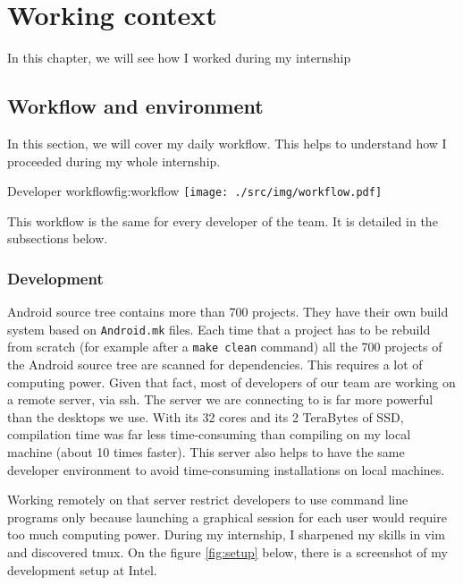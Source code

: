 \chapter{Working context}\label{chap:organisation}

In this chapter, we will see how I worked during my internship

\section{Workflow and environment}
In this section, we will cover my daily workflow. This helps
to understand how I proceeded during my whole internship.

\begin{figureGraphics}{Developer workflow}{fig:workflow}
    \texttt{[image: ./src/img/workflow.pdf]}
\end{figureGraphics}

This workflow is the same for every developer of the team. It is
detailed in the subsections below.

\subsection{Development}
Android source tree contains more than 700 projects. They have their own build system
based on \lstinline{Android.mk} files. Each time that a project has to be rebuild from scratch (for example after a  \lstinline{make clean} command) all
the 700 projects of the Android source tree are scanned for dependencies. This requires a lot of computing power.
Given that fact, most of developers of our team are working on a remote server, via ssh.
The server we are connecting to is far more powerful than the desktops we use.
With its 32 cores and its 2 TeraBytes of SSD, compilation time was far less time-consuming
than compiling on my local machine (about 10 times faster).
This server also helps to have the same developer environment to avoid
time-consuming installations on local machines.

Working remotely on that server restrict developers to use command line programs only because
launching a graphical session for each user would require too much computing power.
During my internship, I sharpened my skills in \gls{vim} and discovered \gls{tmux}.
On the figure \ref{fig:setup} below, there is a screenshot of my development setup at Intel.

